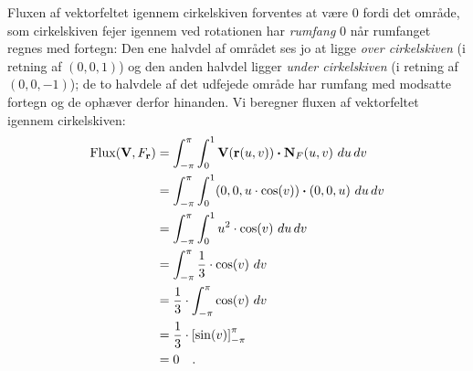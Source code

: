 \begin{example}
Fluxen af vektorfeltet igennem cirkelskiven forventes at være $0$ fordi det område, som cirkelskiven fejer igennem ved rotationen har \emph{rumfang} $0$ når rumfanget regnes med fortegn: Den ene halvdel af området ses jo at ligge \emph{over cirkelskiven} (i retning af $(0,0,1)$) og den anden halvdel ligger \emph{under cirkelskiven} (i retning af $(0,0,-1)$); de to halvdele af det udfejede område har rumfang med  modsatte fortegn og de ophæver derfor hinanden. Vi beregner fluxen af vektorfeltet igennem cirkelskiven:
\begin{equation}
\begin{aligned}
\operatorname{Flux}(\mathbf{V}, F_{\mathbf{r}}) &= \int_{-\pi}^{\pi} \int_{0}^{1} \mathbf{V}(\mathbf{r}(u,v)) \bm{\cdot} \mathbf{N}_{F}(u,v) \, \, du \, dv \\
&= \int_{-\pi}^{\pi} \int_{0}^{1} (0, 0, u\cdot \cos(v))  \bm{\cdot}(0,0,u) \, \, du \, dv \\
&= \int_{-\pi}^{\pi} \int_{0}^{1} u^{2} \cdot \cos(v) \, \, du \, dv \\
&= \int_{-\pi}^{\pi} \frac{1}{3} \cdot \cos(v) \, \, dv \\
&= \frac{1}{3} \cdot \int_{-\pi}^{\pi} \cos(v) \, \, dv \\
&= \frac{1}{3} \cdot \left[\sin(v) \right]_{-\pi}^{\pi} \\
&= 0 \quad .
\end{aligned}
\end{equation}


\end{example}
